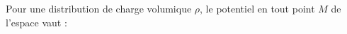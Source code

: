 ﻿\documentclass[a4paper]{article}
\begin{document}
\pagestyle{fancy}
\fancyhf{}
\setlength{\headheight}{15pt}

\begin{center}
	\large{}
\end{center}


Pour une distribution de charge volumique \(\rho\), le potentiel en tout point \(M\) de l'espace vaut :\begin{center}\end{center}
\end{document}
